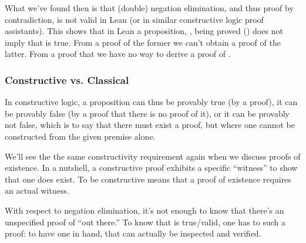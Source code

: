 \documentclass[letterpaper,10pt,english]{sphinxmanual}
\begin{document}
\begin{sphinxVerbatim}[commandchars=\\\{\}]
         
  
 
\end{sphinxVerbatim}

\sphinxAtStartPar
What we’ve found then is that (double) negation elimination,
and thus proof by contradiction, is not valid in Lean (or in
similar constructive logic proof assistants). This shows that
in Lean a proposition, , being proved  ()
does not imply that  is true. From a proof of the former we
can’t obtain a proof of the latter. From a proof that  we have no way to derive a proof of .


\subsubsection{Constructive vs. Classical}
\label{\detokenize{A_02_Constructive_Logic:constructive-vs-classical}}
\sphinxAtStartPar
In constructive logic, a proposition can thus be provably true
(by a proof), it can be provably false (by a proof that there is
no proof of it), or it can be provably not false, which is to
say that there must exist a proof, but where one cannot be
constructed from the given premise alone.

\sphinxAtStartPar
We’ll see the the same constructivity requirement again when we
discuss proofs of existence. In a nutshell, a constructive proof
exhibits a specific “witness” to show that one does exist. To be
constructive means that a proof of existence requires an actual
witness.

\sphinxAtStartPar
With respect to negation elimination, it’s not enough to know
that there’s an unspecified proof of  “out there.” To know
that  is true/valid, one has to  such a proof: to
have one in hand, that can actually be inspected and verified.
\end{document}
